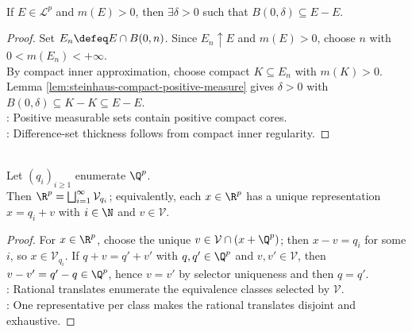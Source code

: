 \begin{theorem} \label{thm:steinhaus-positive-measure-difference-neighborhood} \\
If $E\in\mathcal{L}^p$ and $m(E)>0$, then $\exists\delta>0$ such that $B(0,\delta)\subseteq E-E$.
\begin{proof}
Set $E_n\defeq E\cap B(0,n)$. Since $E_n\uparrow E$ and $m(E)>0$, choose $n$ with $0<m(E_n)<+\infty$.\\
By compact inner approximation, choose compact $K\subseteq E_n$ with $m(K)>0$.\\
Lemma \ref{lem:steinhaus-compact-positive-measure} gives $\delta>0$ with $B(0,\delta)\subseteq K-K\subseteq E-E$.\\
: Positive measurable sets contain positive compact cores.\\
: Difference-set thickness follows from compact inner regularity.
\end{proof}
\end{theorem}

\begin{lemma} \label{lem:vitali-translates-partition} \\
Let $(q_i)_{i\geq1}$ enumerate $\Q^p$.\\
Then $\R^p=\bigsqcup_{i=1}^{\infty}\mathcal{V}_{q_i}$; equivalently, each $x\in\R^p$ has a unique representation $x=q_i+v$ with $i\in\N$ and $v\in\mathcal{V}$.
\begin{proof}
For $x\in\R^p$, choose the unique $v\in\mathcal{V}\cap(x+\Q^p)$; then $x-v=q_i$ for some $i$, so $x\in\mathcal{V}_{q_i}$. If $q+v=q'+v'$ with $q,q'\in\Q^p$ and $v,v'\in\mathcal{V}$, then $v-v'=q'-q\in\Q^p$, hence $v=v'$ by selector uniqueness and then $q=q'$.\\
: Rational translates enumerate the equivalence classes selected by $\mathcal{V}$.\\
: One representative per class makes the rational translates disjoint and exhaustive.
\end{proof}
\end{lemma}

